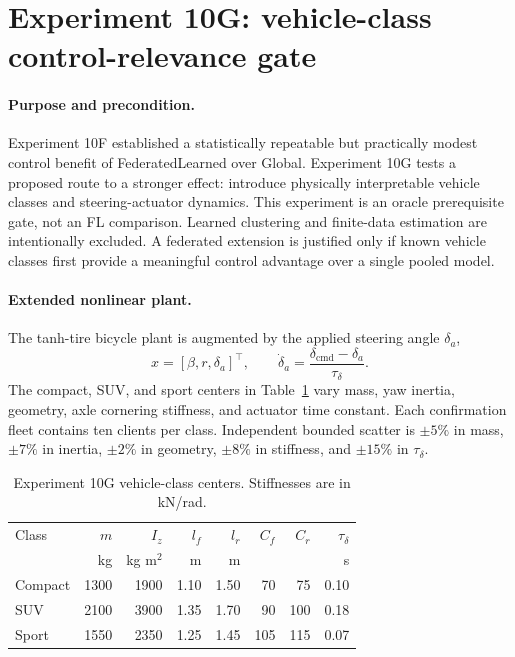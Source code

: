 \section{Experiment 10G: vehicle-class control-relevance gate}
\label{sec:experiment10g}

\paragraph{Purpose and precondition.}
Experiment 10F established a statistically repeatable but practically modest
control benefit of FederatedLearned over Global. Experiment 10G tests a
proposed route to a stronger effect: introduce physically interpretable
vehicle classes and steering-actuator dynamics. This experiment is an oracle
prerequisite gate, not an FL comparison. Learned clustering and finite-data
estimation are intentionally excluded. A federated extension is justified
only if known vehicle classes first provide a meaningful control advantage
over a single pooled model.

\paragraph{Extended nonlinear plant.}
The tanh-tire bicycle plant is augmented by the applied steering angle
$\delta_a$,
\begin{equation}
 x=[\beta,r,\delta_a]^\top,\qquad
 \dot{\delta}_a=\frac{\delta_{\mathrm{cmd}}-\delta_a}{\tau_\delta}.
\end{equation}
The compact, SUV, and sport centers in Table~\ref{tab:experiment10g-fleet}
vary mass, yaw inertia, geometry, axle cornering stiffness, and actuator time
constant. Each confirmation fleet contains ten clients per class. Independent
bounded scatter is $\pm5\%$ in mass, $\pm7\%$ in inertia, $\pm2\%$ in geometry,
$\pm8\%$ in stiffness, and $\pm15\%$ in $\tau_\delta$.

\begin{table}[htbp]
\centering
\caption{Experiment 10G vehicle-class centers. Stiffnesses are in kN/rad.}
\label{tab:experiment10g-fleet}
\begin{tabular}{lrrrrrrr}
\toprule
Class & $m$ & $I_z$ & $l_f$ & $l_r$ & $C_f$ & $C_r$ & $\tau_\delta$\\
 & kg & kg m$^2$ & m & m & & & s\\
\midrule
Compact & 1300 & 1900 & 1.10 & 1.50 & 70 & 75 & 0.10\\
SUV     & 2100 & 3900 & 1.35 & 1.70 & 90 & 100 & 0.18\\
Sport   & 1550 & 2350 & 1.25 & 1.45 & 105 & 115 & 0.07\\
\bottomrule
\end{tabular}
\end{table}

